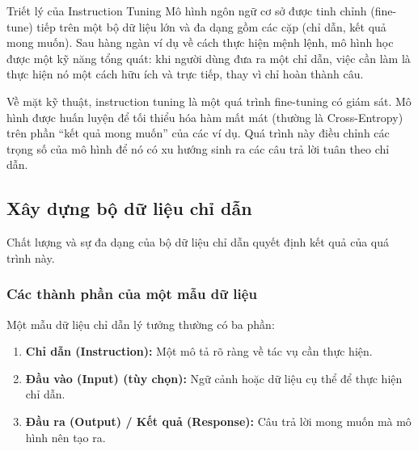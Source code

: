 \begin{keyidea}{Triết lý của Instruction Tuning}
Mô hình ngôn ngữ cơ sở được tinh chỉnh (fine-tune) tiếp trên một bộ dữ liệu lớn và đa dạng gồm các cặp (chỉ dẫn, kết quả mong muốn). Sau hàng ngàn ví dụ về cách thực hiện mệnh lệnh, mô hình học được một kỹ năng tổng quát: khi người dùng đưa ra một chỉ dẫn, việc cần làm là thực hiện nó một cách hữu ích và trực tiếp, thay vì chỉ hoàn thành câu.
\end{keyidea}

Về mặt kỹ thuật, instruction tuning là một quá trình fine-tuning có giám sát. Mô hình được huấn luyện để tối thiểu hóa hàm mất mát (thường là Cross-Entropy) trên phần “kết quả mong muốn” của các ví dụ. Quá trình này điều chỉnh các trọng số của mô hình để nó có xu hướng sinh ra các câu trả lời tuân theo chỉ dẫn.

\subsection{Xây dựng bộ dữ liệu chỉ dẫn}
\label{ssec:instruction_dataset_building}

Chất lượng và sự đa dạng của bộ dữ liệu chỉ dẫn quyết định kết quả của quá trình này.

\subsubsection{Các thành phần của một mẫu dữ liệu}
Một mẫu dữ liệu chỉ dẫn lý tưởng thường có ba phần:
\begin{enumerate}
    \item \textbf{Chỉ dẫn (Instruction):} Một mô tả rõ ràng về tác vụ cần thực hiện.
    \item \textbf{Đầu vào (Input) (tùy chọn):} Ngữ cảnh hoặc dữ liệu cụ thể để thực hiện chỉ dẫn.
    \item \textbf{Đầu ra (Output) / Kết quả (Response):} Câu trả lời mong muốn mà mô hình nên tạo ra.
\end{enumerate}

